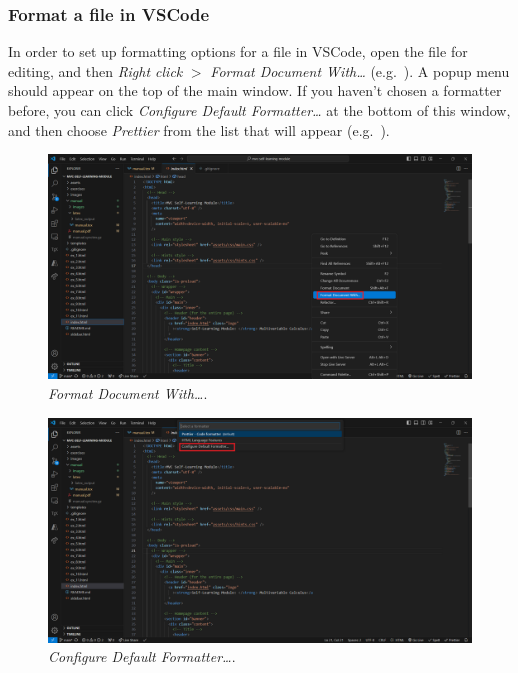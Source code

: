 \documentclass[a4paper,10pt]{article}
\begin{document}
\subsubsection{Format a file in VSCode}

In order to set up formatting options for a file in VSCode, open the file for editing, and then \emph{Right click} $>$ \emph{Format Document With\dots} (e.g.\ ). A popup menu should appear on the top of the main window. If you haven't chosen a formatter before, you can click \emph{Configure Default Formatter\dots} at the bottom of this window, and then choose \emph{Prettier} from the list that will appear (e.g.\ ). 

\begin{figure}[htbp]
    \centering
    \includegraphics[width=\textwidth]{format_doc.png}
    \caption{\emph{Format Document With\dots}.}
    \label{fig:format_doc}   
\end{figure}

\begin{figure}[htbp]
    \centering
    \includegraphics[width=\textwidth]{configure_formatter.png}
    \caption{\emph{Configure Default Formatter\dots}.}
    \label{fig:configure_formatter}   
\end{figure}
\end{document}
